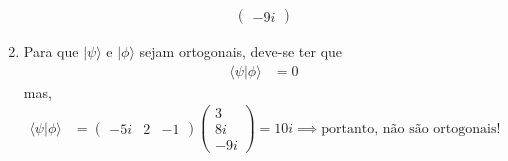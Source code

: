 \begin{prob}
\begin{sol}
\begin{enumerate}[label=\alph *)]
\begin{align}
{\begin{pmatrix}
							 -9i
						 \end{pmatrix}
					 }
					 \end{align}
				 \item Para que $|{\psi}\rangle$ e $|{\phi}\rangle$ sejam ortogonais, deve-se ter que
					 \begin{align}
						 \langle{\psi}|{\phi}\rangle &= 0
					 \end{align}
					 mas,
					 \begin{align}
						 \langle{\psi}|{\phi}\rangle &= 
						 \begin{pmatrix}
							 -5i & 2 & -1
						 \end{pmatrix}
						 \begin{pmatrix}
							 3 \\
							 8i \\
							 -9i
						 \end{pmatrix} = 10i\implies \boxed{\text{portanto, não são ortogonais!}}
					 \end{align}
			 \end{enumerate}
		 \end{sol}		
	 \end{prob}

